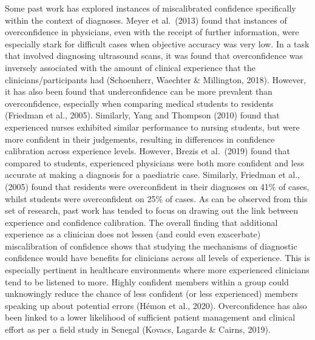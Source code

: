 \documentclass[a4paper, nobind]{templates/ociamthesis}
\begin{document}
\hfill\break
Some past work has explored instances of miscalibrated confidence specifically within the context of diagnoses. Meyer et al.~(2013) found that instances of overconfidence in physicians, even with the receipt of further information, were especially stark for difficult cases when objective accuracy was very low. In a task that involved diagnosing ultrasound scans, it was found that overconfidence was inversely associated with the amount of clinical experience that the clinicians/participants had (Schoenherr, Waechter \& Millington, 2018). However, it has also been found that underconfidence can be more prevalent than overconfidence, especially when comparing medical students to residents (Friedman et al., 2005). Similarly, Yang and Thompson (2010) found that experienced nurses exhibited similar performance to nursing students, but were more confident in their judgements, resulting in differences in confidence calibration across experience levels. However, Brezis et al.~(2019) found that compared to students, experienced physicians were both more confident and less accurate at making a diagnosis for a paediatric case. Similarly, Friedman et al., (2005) found that residents were overconfident in their diagnoses on 41\% of cases, whilst students were overconfident on 25\% of cases. As can be observed from this set of research, past work has tended to focus on drawing out the link between experience and confidence calibration. The overall finding that additional experience as a clinician does not lessen (and could even exacerbate) miscalibration of confidence shows that studying the mechanisms of diagnostic confidence would have benefits for clinicians across all levels of experience. This is especially pertinent in healthcare environments where more experienced clinicians tend to be listened to more. Highly confident members within a group could unknowingly reduce the chance of less confident (or less experienced) members speaking up about potential errors (Hémon et al., 2020). Overconfidence has also been linked to a lower likelihood of sufficient patient management and clinical effort as per a field study in Senegal (Kovacs, Lagarde \& Cairns, 2019).
\end{document}
